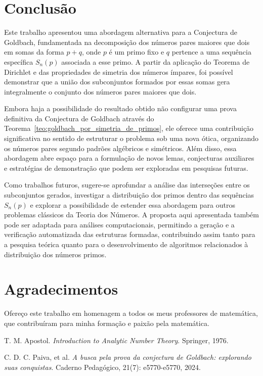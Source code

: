 \documentclass[a4paper,11pt]{article}
\theoremstyle{definition}
\theoremstyle{remark}
\begin{document}
\begin{otherlanguage}{brazil}
	
	\section{Conclusão}
	
	Este trabalho apresentou uma abordagem alternativa para a Conjectura de Goldbach, fundamentada na decomposição dos números pares maiores que dois em somas da forma \(p + q\), onde \(p\) é um primo fixo e \(q\) pertence a uma sequência específica \(S_n(p)\) associada a esse primo. A partir da aplicação do Teorema de Dirichlet e das propriedades de simetria dos números ímpares, foi possível demonstrar que a união dos subconjuntos formados por essas somas gera integralmente o conjunto dos números pares maiores que dois.
	
	Embora haja a possibilidade do resultado obtido não configurar uma prova definitiva da Conjectura de Goldbach através do Teorema~\ref{teo:goldbach_por_simetria_de_primos}, ele oferece uma contribuição significativa no sentido de estruturar o problema sob uma nova ótica, organizando os números pares segundo padrões algébricos e simétricos. Além disso, essa abordagem abre espaço para a formulação de novos lemas, conjecturas auxiliares e estratégias de demonstração que podem ser exploradas em pesquisas futuras.
	
	Como trabalhos futuros, sugere-se aprofundar a análise das interseções entre os subconjuntos gerados, investigar a distribuição dos primos dentro das sequências \(S_n(p)\) e explorar a possibilidade de estender essa abordagem para outros problemas clássicos da Teoria dos Números. A proposta aqui apresentada também pode ser adaptada para análises computacionais, permitindo a geração e a verificação automatizada das estruturas formadas, contribuindo assim tanto para a pesquisa teórica quanto para o desenvolvimento de algoritmos relacionados à distribuição dos números primos.
	
	\section*{Agradecimentos}
	
	Ofereço este trabalho em homenagem a todos os meus professores de matemática, que contribuíram para minha formação e paixão pela matemática.
	
	\end{otherlanguage}
	\begin{thebibliography}{9}
		
		T. M. Apostol.
		\textit{Introduction to Analytic Number Theory}.
		Springer, 1976.
		
		C. D. C. Paiva, et al. \textit{A busca pela prova da conjectura de Goldbach: explorando suas conquistas}. Caderno Pedagógico, 21(7): e5770-e5770, 2024.
		
		
		
		
	\end{thebibliography}
	
\end{document}

